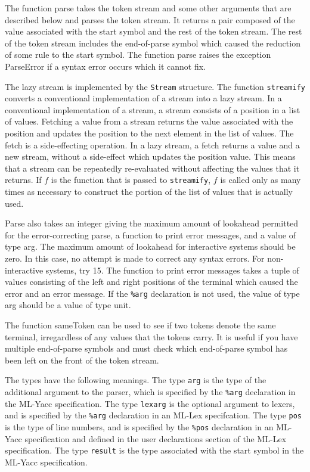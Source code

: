 The function parse takes the token stream and some other arguments that
are described below and parses the token stream.  It returns a pair composed
of the value associated with the start symbol and the rest of
the token stream.  The rest of the token stream includes the
end-of-parse symbol which caused the reduction of some rule
to the start symbol.  The function parse raises the
exception ParseError if a syntax error occurs which it cannot fix.

The lazy stream is implemented by the {\tt Stream} structure.
The function {\tt streamify} converts a conventional implementation
of a stream into a lazy stream.  In a conventional implementation
of a stream, a stream consists of a position in a list of
values.  Fetching a value from a stream returns the
value associated with the position and updates the position to
the next element in the list of values.  The fetch is a side-effecting
operation.  In a lazy stream, a fetch returns a value and a new
stream, without a side-effect which updates the position value.
This means that a stream can be repeatedly re-evaluated without
affecting the values that it returns.  If $f$ is the function
that is passed to {\tt streamify}, $f$ is called only as many
times as necessary to construct the portion of the list of values
that is actually used.

Parse also takes an integer giving the maximum amount of lookahead permitted
for the error-correcting parse, a function to print error messages,
and a value of type arg.  The maximum amount of lookahead for interactive
systems should be zero.  In this case, no attempt is made to correct any
syntax errors.  For non-interactive systems, try 15.  The
function to print error messages takes a tuple of values consisting
of the left and right positions of the terminal which caused the error
and an error message.   If the {\tt \%arg} declaration is not used, the
value of type arg should be a value of type unit.

The function sameToken can be used to see if two tokens
denote the same terminal, irregardless of any values that the
tokens carry.  It is useful if you have multiple end-of-parse
symbols and must check which end-of-parse symbol has been left on the
front of the token stream.

The types have the following meanings.  The type {\tt arg} is the type
of the additional argument to the parser, which is specified by the
{\tt \%arg} declaration in the ML-Yacc specification.  The type
{\tt lexarg} is the optional argument to lexers, and is specified by
the {\tt \%arg} declaration in an ML-Lex specifcation.  The type {\tt pos}
is the type of line numbers, and is specified by the {\tt \%pos} declaration
in an ML-Yacc specification and defined in the user declarations
section of the ML-Lex specification.  The type {\tt result} is
the type associated with the start symbol in the ML-Yacc specification.

